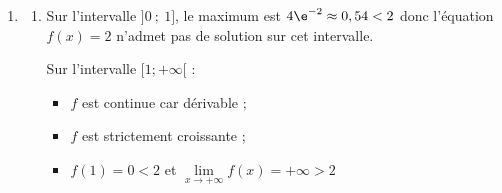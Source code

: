 \begin{enumerate}
\begin{enumerate}
On a alors :\quad $\forall x \in ]0;+\infty[ 
\begin{cases} u'(x)=1 \\ v'(x)=2 \times \dfrac{1}{x} \times \ln x 
\end{cases}$ 

Or :\quad $f' = u'v+v'u$ 

Donc, $\begin{aligned}[t]\forall x \in ] 0 ;+\infty[, \quad f'(x)&= 1 \times (\ln x)^2 + x \times \dfrac{2 \ln x}{x}\\
		&= \ln x \times \ln x + 2 \ln x \\
		&=(\ln x)(\ln x +2)
\end{aligned}$
		
Donc sur l'intervalle $]0~;~+\infty[$, \: $f'(x) = (\ln x)(2 + \ln x)$.

	\item On en déduit les variations de la fonction $f$ sur l'intervalle $]0~;~+\infty[$.

Étudions le signe de $f'(x)$ : 

$2+ \ln(x)> 0 \Longleftrightarrow \ln x > -2 \Longleftrightarrow x > \e^{-2}$ 

$\ln x > 0 \Longleftrightarrow x >1$ 

On a donc le tableau de variations suivant : 

\hfill~\hfill~

		\item $f\left(\e^{-2}\right) = \e^{-2} \left( \ln \left(\e^{-2}\right) \right) ^2= \e^{-2} \times (-2)^2= 4 \e^{-2}$

Le maximum de la fonction $f$ sur l'intervalle $]0~;~1]$ est $4\e^{-2}$.
	\end{enumerate}

\item 
	\begin{enumerate}
		\item Sur l'intervalle $]0~;~1]$, le maximum est $4\e^{-2} \approx 0,54 < 2$ donc l'équation $f(x) = 2$ n'admet pas de solution sur cet intervalle.

Sur l'intervalle $[1; +\infty[$ : 
\begin{itemize}
	\item $f$ est continue car dérivable ;
	\item $f$ est strictement croissante ;
	\item $f(1) =0 <2$ et $\lim\limits_{x \to +\infty} f(x)= +\infty >2$ 
\end{itemize}


\end{enumerate}
\end{enumerate}
